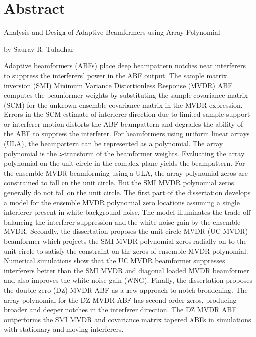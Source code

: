 
\onehalfspacing
\chapter*{Abstract}
Analysis and Design of Adaptive Beamformers using Array Polynomial
\begin{flushleft}
by Saurav R. Tuladhar \\
\end{flushleft}

Adaptive beamformers (ABFs) place deep beampattern notches near
interferers to suppress the interferers’ power in the ABF output. The
sample matrix inversion (SMI) Minimum Variance Distortionless Response
(MVDR) ABF computes the beamformer weights by substituting the sample
covariance matrix (SCM) for the unknown ensemble covariance matrix in
the MVDR expression. Errors in the SCM estimate of interferer
direction due to limited sample support or interferer motion distorts
the ABF beampattern and degrades the ability of the ABF to suppress
the interferer. For beamformers using uniform linear arrays (ULA), the
beampattern can be represented as a polynomial. The array polynomial
is the $z$-transform of the beamformer weights. Evaluating the array
polynomial on the unit circle in the complex plane yields the
beampattern. For the ensemble MVDR beamforming using a ULA, the array
polynomial zeros are constrained to fall on the unit circle. But the
SMI MVDR polynomial zeros generally do not fall on the unit
circle. The first part of the dissertation develops a model for the
ensemble MVDR polynomial zero locations assuming a single interferer
present in white background noise. The model illuminates the trade off
balancing the interferer suppression and the white noise gain by the
ensemble MVDR. Secondly, the dissertation proposes the unit circle
MVDR (UC MVDR) beamformer which projects the SMI MVDR polynomial zeros
radially on to the unit circle to satisfy the constraint on the zeros
of ensemble MVDR polynomial. Numerical simulations show that the UC
MVDR beamformer suppresses interferers better than the SMI MVDR and
diagonal loaded MVDR beamformer and also improves the white noise gain
(WNG). Finally, the dissertation proposes the double zero (DZ) MVDR
ABF as a new approach to notch broadening. The array polynomial for
the DZ MVDR ABF has second-order zeros, producing broader and deeper
notches in the interferer direction. The DZ MVDR ABF outperforms the
SMI MVDR and covariance matrix tapered ABFs in simulations with
stationary and moving interferers.

\restoregeometry

